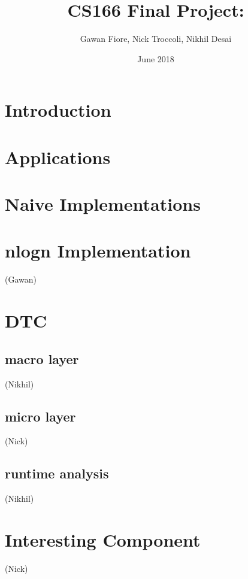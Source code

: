\documentclass{article}
\title{CS166 Final Project: }
\author{Gawan Fiore, Nick Troccoli, Nikhil Desai}
\date{June 2018}
\begin{document}
\maketitle

\section{Introduction}
\section{Applications}
\section{Naive Implementations}

\section{nlogn Implementation}
(Gawan)

\section{DTC}
\subsection{macro layer}
(Nikhil)
\subsection{micro layer}
(Nick)
\subsection{runtime analysis}
(Nikhil)
\section{Interesting Component}
(Nick)
\end{document}
